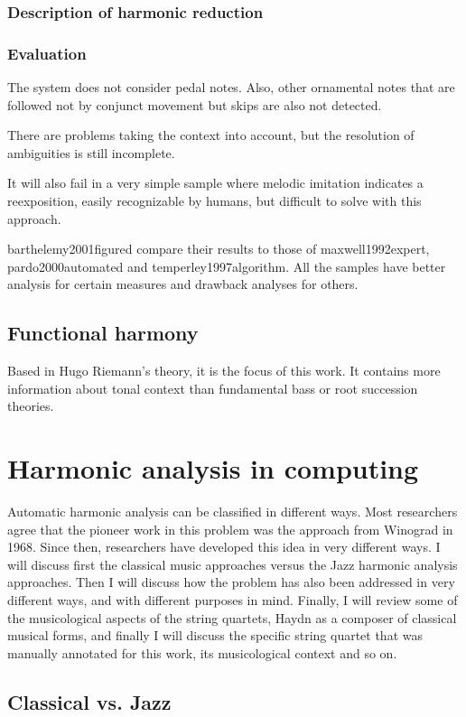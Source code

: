 	\subsubsection{Description of harmonic reduction}
	\subsubsection{Evaluation}
		The system does not consider pedal notes. Also, other ornamental notes that are followed not by conjunct movement but skips are also not detected.

		There are problems taking the context into account, but the resolution of ambiguities is still incomplete.

		It will also fail in a very simple sample where melodic imitation indicates a reexposition, easily recognizable by humans, but difficult to solve with this approach.

		barthelemy2001figured compare their results to those of maxwell1992expert, pardo2000automated and temperley1997algorithm. All the samples have better analysis for certain measures and drawback analyses for others.
  \subsection{Functional harmony}
  Based in Hugo Riemann's theory, it is the focus of this work. It contains more information about tonal context than fundamental bass or root succession theories.
\section{Harmonic analysis in computing}
  Automatic harmonic analysis can be classified in different ways. Most researchers agree that the pioneer work in this problem was the approach from Winograd in 1968. Since then, researchers have developed this idea in very different ways. I will discuss first the classical music approaches versus the Jazz harmonic analysis approaches. Then I will discuss how the problem has also been addressed in very different ways, and with different purposes in mind. Finally, I will review some of the musicological aspects of the string quartets, Haydn as a composer of classical musical forms, and finally I will discuss the specific string quartet that was manually annotated for this work, its musicological context and so on.
  \subsection{Classical vs. Jazz}
